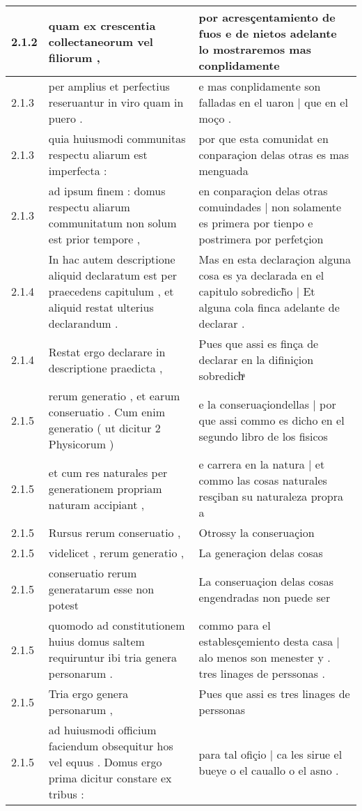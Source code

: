 \begin{tabular}{|p{1cm}|p{6.5cm}|p{6.5cm}|}
2.1.2 & quam ex crescentia collectaneorum vel filiorum , & por acresçentamiento de fuos e de nietos adelante lo mostraremos mas conplidamente \\\hline
2.1.3 & per amplius et perfectius reseruantur in viro quam in puero . & e mas conplidamente son falladas en el uaron | que en el moço . \\\hline
2.1.3 & quia huiusmodi communitas respectu aliarum est imperfecta : & por que esta comunidat en conparaçion delas otras es mas menguada \\\hline
2.1.3 & ad ipsum finem : domus respectu aliarum communitatum non solum est prior tempore , & en conparaçion delas otras comuindades | non solamente es primera por tienpo e postrimera por perfetçion \\\hline
2.1.4 & In hac autem descriptione aliquid declaratum est per praecedens capitulum , et aliquid restat ulterius declarandum . & Mas en esta declaraçion alguna cosa es ya declarada en el capitulo sobredich̃o | Et alguna cola finca adelante de declarar . \\\hline
2.1.4 & Restat ergo declarare in descriptione praedicta , & Pues que assi es finça de declarar en la difiniçion sobredichͣ \\\hline
2.1.5 & rerum generatio , et earum conseruatio . Cum enim generatio ( ut dicitur 2 Physicorum ) & e la conseruaçiondellas | por que assi commo es dicho en el segundo libro de los fisicos \\\hline
2.1.5 & et cum res naturales per generationem propriam naturam accipiant , & e carrera en la natura | et commo las cosas naturales resçiban su naturaleza propra a \\\hline
2.1.5 & Rursus rerum conseruatio , & Otrossy la conseruaçion \\\hline
2.1.5 & videlicet , rerum generatio , & La generaçion delas cosas \\\hline
2.1.5 & conseruatio rerum generatarum esse non potest & La conseruaçion delas cosas engendradas non puede ser \\\hline
2.1.5 & quomodo ad constitutionem huius domus saltem requiruntur ibi tria genera personarum . & commo para el establesçemiento desta casa | alo menos son menester y . tres linages de perssonas . \\\hline
2.1.5 & Tria ergo genera personarum , & Pues que assi es tres linages de perssonas \\\hline
2.1.5 & ad huiusmodi officium faciendum obsequitur hos vel equus . Domus ergo prima dicitur constare ex tribus : & para tal ofiçio | ca les sirue el bueye o el cauallo o el asno . \\\hline

\end{tabular}
